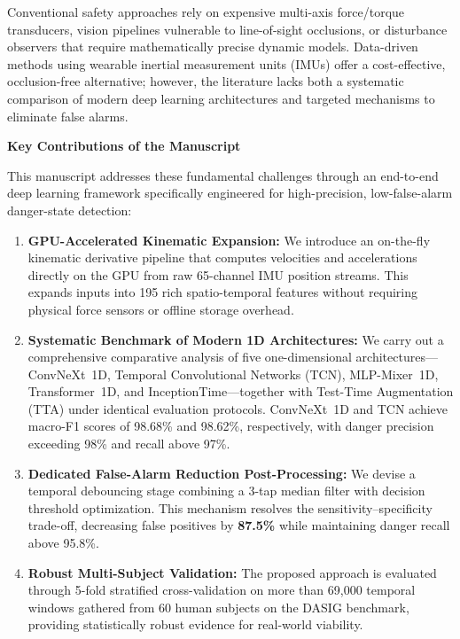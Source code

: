 \documentclass[11pt,a4paper]{article}
\begin{document}
Conventional safety approaches rely on expensive multi-axis force/torque transducers, vision pipelines vulnerable to line-of-sight occlusions, or disturbance observers that require mathematically precise dynamic models. Data-driven methods using wearable inertial measurement units (IMUs) offer a cost-effective, occlusion-free alternative; however, the literature lacks both a systematic comparison of modern deep learning architectures and targeted mechanisms to eliminate false alarms.

\vspace{0.3em}
{\large\textbf{Key Contributions of the Manuscript}}\par\vspace{2pt}
This manuscript addresses these fundamental challenges through an end-to-end deep learning framework specifically engineered for high-precision, low-false-alarm danger-state detection:
\begin{enumerate}[leftmargin=*,itemsep=1.5pt,topsep=1.5pt,partopsep=0pt]
    \item \textbf{GPU-Accelerated Kinematic Expansion:} We introduce an on-the-fly kinematic derivative pipeline that computes velocities and accelerations directly on the GPU from raw 65-channel IMU position streams. This expands inputs into 195 rich spatio-temporal features without requiring physical force sensors or offline storage overhead.
    \item \textbf{Systematic Benchmark of Modern 1D Architectures:} We carry out a comprehensive comparative analysis of five one-dimensional architectures—ConvNeXt~1D, Temporal Convolutional Networks (TCN), MLP-Mixer~1D, Transformer~1D, and InceptionTime—together with Test-Time Augmentation (TTA) under identical evaluation protocols. ConvNeXt~1D and TCN achieve macro-F1 scores of 98.68\% and 98.62\%, respectively, with danger precision exceeding 98\% and recall above 97\%.
    \item \textbf{Dedicated False-Alarm Reduction Post-Processing:} We devise a temporal debouncing stage combining a 3-tap median filter with decision threshold optimization. This mechanism resolves the sensitivity--specificity trade-off, decreasing false positives by \textbf{87.5\%} while maintaining danger recall above 95.8\%.
    \item \textbf{Robust Multi-Subject Validation:} The proposed approach is evaluated through 5-fold stratified cross-validation on more than 69,000 temporal windows gathered from 60 human subjects on the DASIG benchmark, providing statistically robust evidence for real-world viability.
\end{enumerate}
\end{document}
